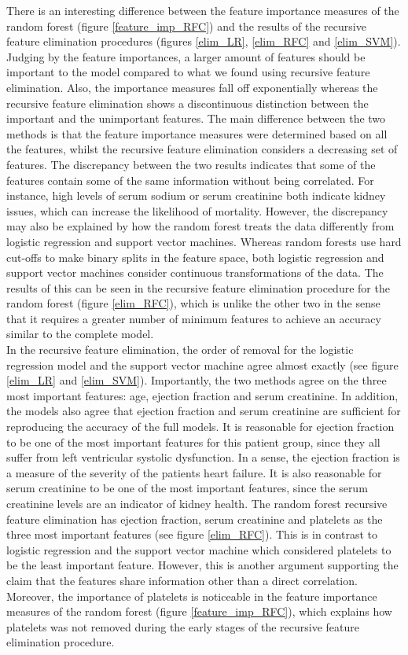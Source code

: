\documentclass[notitlepage, reprint, nofootinbib]{revtex4-1}
\begin{document}
There is an interesting difference between the feature importance measures of the random forest (figure \ref{feature_imp_RFC}) and the results of the recursive feature elimination procedures (figures \ref{elim_LR}, \ref{elim_RFC} and \ref{elim_SVM}). Judging by the feature importances, a larger amount of features should be important to the model compared to what we found using recursive feature elimination. Also, the importance measures fall off exponentially whereas the recursive feature elimination shows a discontinuous distinction between the important and the unimportant features. The main difference between the two methods is that the feature importance measures were determined based on all the features, whilst the recursive feature elimination considers a decreasing set of features. The discrepancy between the two results indicates that some of the features contain some of the same information without being correlated. For instance, high levels of serum sodium or serum creatinine both indicate kidney issues, which can increase the likelihood of mortality. However, the discrepancy may also be explained by how the random forest treats the data differently from logistic regression and support vector machines. Whereas random forests use hard cut-offs to make binary splits in the feature space, both logistic regression and support vector machines consider continuous transformations of the data. The results of this can be seen in the recursive feature elimination procedure for the random forest (figure \ref{elim_RFC}), which is unlike the other two in the sense that it requires a greater number of minimum features to achieve an accuracy similar to the complete model. \\[2mm]
In the recursive feature elimination, the order of removal for the logistic regression model and the support vector machine agree almost exactly (see figure \ref{elim_LR} and \ref{elim_SVM}). Importantly, the two methods agree on the three most important features: age, ejection fraction and serum creatinine. In addition, the models also agree that ejection fraction and serum creatinine are sufficient for reproducing the accuracy of the full models. It is reasonable for ejection fraction to be one of the most important features for this patient group, since they all suffer from left ventricular systolic dysfunction. In a sense, the ejection fraction is a measure of the severity of the patients heart failure. It is also reasonable for serum creatinine to be one of the most important features, since the serum creatinine levels are an indicator of kidney health. The random forest recursive feature elimination has ejection fraction, serum creatinine and platelets as the three most important features (see figure \ref{elim_RFC}). This is in contrast to logistic regression and the support vector machine which considered platelets to be the least important feature. However, this is another argument supporting the claim that the features share information other than a direct correlation. Moreover, the importance of platelets is noticeable in the feature importance measures of the random forest (figure \ref{feature_imp_RFC}), which explains how platelets was not removed during the early stages of the recursive feature elimination procedure. 
\end{document}
